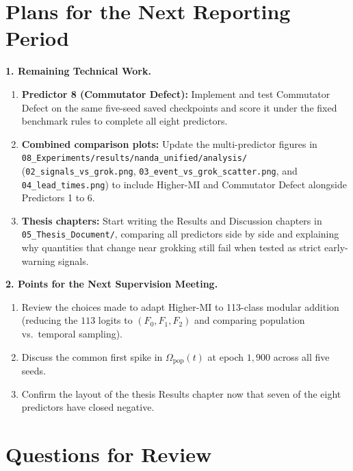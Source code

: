 \documentclass[11pt,a4paper,oneside]{report}
\newcommand{\Fzero}{F_{0}}
\newcommand{\Fone}{F_{1}}
\newcommand{\Ftwo}{F_{2}}
\newcommand{\Omegapop}{\Omega_{\mathrm{pop}}}
\begin{document}
\section{Plans for the Next Reporting Period}

\noindent\textbf{1. Remaining Technical Work.}
\begin{enumerate}[label=\textbf{(\roman*)}]
\item \textbf{Predictor 8 (Commutator Defect):} Implement and test Commutator Defect on the same five-seed saved checkpoints and score it under the fixed benchmark rules to complete all eight predictors.
\item \textbf{Combined comparison plots:} Update the multi-predictor figures in \texttt{08\_Experiments/results/nanda\_unified/analysis/} (\texttt{02\_signals\_vs\_grok.png}, \texttt{03\_event\_vs\_grok\_scatter.png}, and \texttt{04\_lead\_times.png}) to include Higher-MI and Commutator Defect alongside Predictors 1 to 6.
\item \textbf{Thesis chapters:} Start writing the Results and Discussion chapters in \texttt{05\_Thesis\_Document/}, comparing all predictors side by side and explaining why quantities that change near grokking still fail when tested as strict early-warning signals.
\end{enumerate}

\medskip
\noindent\textbf{2. Points for the Next Supervision Meeting.}
\begin{enumerate}[label=\textbf{(\roman*)}]
\item Review the choices made to adapt Higher-MI to 113-class modular addition (reducing the $113$ logits to $(\Fzero, \Fone, \Ftwo)$ and comparing population vs.\ temporal sampling).
\item Discuss the common first spike in $\Omegapop(t)$ at epoch $1{,}900$ across all five seeds.
\item Confirm the layout of the thesis Results chapter now that seven of the eight predictors have closed negative.
\end{enumerate}

\section*{Questions for Review}
\end{document}

